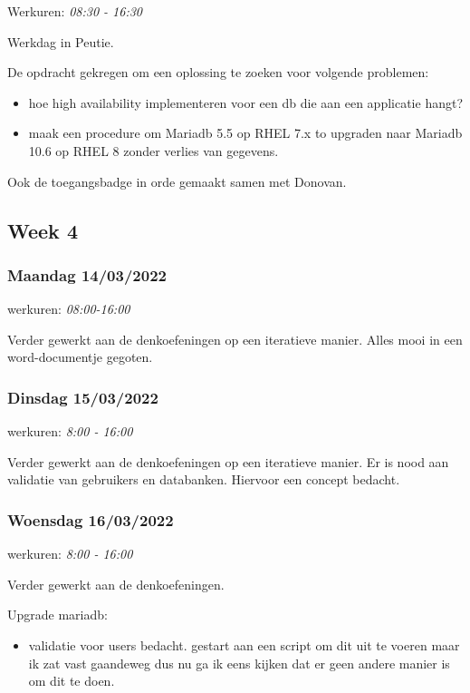 Werkuren: \emph{08:30 - 16:30}

Werkdag in Peutie.

De opdracht gekregen om een oplossing te zoeken voor volgende problemen:

\begin{itemize}
    \item hoe high availability implementeren voor een db die aan een applicatie hangt?
    \item maak een procedure om Mariadb 5.5 op RHEL 7.x to upgraden naar Mariadb 10.6 op RHEL 8 zonder verlies van gegevens.
\end{itemize}

Ook de toegangsbadge in orde gemaakt samen met Donovan.

\subsection{Week 4}

\subsubsection{Maandag 14/03/2022}

werkuren: \emph{08:00-16:00}

Verder gewerkt aan de denkoefeningen op een iteratieve manier. Alles
mooi in een word-documentje gegoten.

\subsubsection{Dinsdag 15/03/2022}

werkuren: \emph{8:00 - 16:00}

Verder gewerkt aan de denkoefeningen op een iteratieve manier. Er is
nood aan validatie van gebruikers en databanken. Hiervoor een concept
bedacht.

\subsubsection{Woensdag 16/03/2022}

werkuren: \emph{8:00 - 16:00}

Verder gewerkt aan de denkoefeningen.

Upgrade mariadb:

\begin{itemize}
    \item validatie voor users bedacht. gestart aan een script om dit uit te
    voeren maar ik zat vast gaandeweg dus nu ga ik eens kijken dat er geen
    andere manier is om dit te doen.
\end{itemize}

